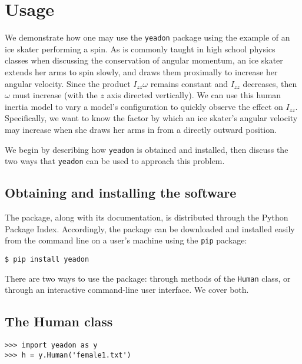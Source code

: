 \documentclass[10pt]{article}
\begin{document}



\section*{Usage}
\label{sec:usage}

We demonstrate how one may use the \verb+yeadon+ package using the example of
an ice skater performing a spin. As is commonly taught in high school physics
classes when discussing the conservation of angular momentum, an ice skater
extends her arms to spin slowly, and draws them proximally to increase her
angular velocity. Since the product $I_{zz}\omega$ remains constant and $I_{zz}$
decreases, then $\omega$ must increase (with the $z$ axis directed vertically).
We can use this human inertia model to vary a model's configuration to quickly
observe the effect on $I_{zz}$. Specifically, we want to know the factor by
which an ice skater's angular velocity may increase when she draws her arms in
from a directly outward position.

We begin by describing how \verb+yeadon+ is obtained and installed, then
discuss the two ways that \verb+yeadon+ can be used to approach this problem.

\subsection*{Obtaining and installing the software}

The package, along with its documentation, is distributed through the Python
Package Index. Accordingly, the package can be downloaded and installed easily
from the command line on a user's machine using the \verb+pip+ package:

\begin{verbatim}
$ pip install yeadon
\end{verbatim}

There are two ways to use the package: through methods of the \verb+Human+
class, or through an interactive command-line user interface. We cover both.



\subsection*{The Human class}

\begin{verbatim}
>>> import yeadon as y
>>> h = y.Human('female1.txt')
\end{verbatim}
\end{document}
